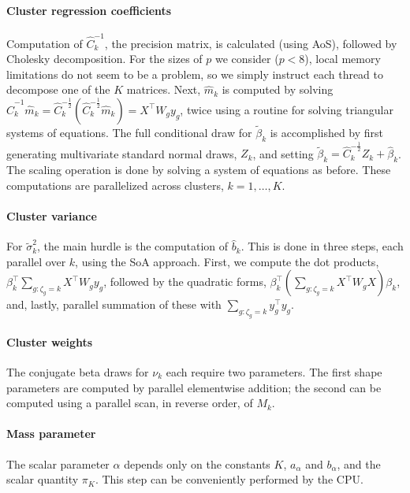 {\paragraph{Cluster regression coefficients}
Computation of
$\hat{C}_k^{-1}$, the precision matrix, is calculated (using AoS), followed
by Cholesky decomposition. For the sizes of $p$ we consider ($p<8$), local memory limitations do not seem to be a problem, so we simply instruct each thread to decompose one of the $K$ matrices. Next, $\hat{m}_k$ is computed
by solving
$\hat{C}_k^{-1}\hat{m}_k=\hat{C}_k^{-\frac{1}{2}}\left(\hat{C}_k^{-\frac{1}{2}}\hat{m}_k\right)
= X^\top W_g y_g$, twice using a routine for solving triangular
systems of equations. The full conditional draw for $\tilde{\beta}_k$ is
accomplished by first generating multivariate standard normal draws, $Z_k$, and setting $\tilde{\beta}_k =
\hat{C}_k^{-\frac{1}{2}} Z_k + \hat{\beta}_k$. The scaling operation is
done by solving a system of equations as before. These
computations are parallelized across clusters, $k=1,\ldots,K$.

\paragraph{Cluster variance}
For $\tilde{\sigma}^2_k$, the main hurdle is the computation of
$\hat{b}_k$. This is done in three steps, each parallel over $k$, using
the SoA approach. First,
we compute the dot products, $\beta_k^\top \sum_{g:\zeta_g=k}X^\top W_g y_g$, followed by the quadratic forms, $\beta_k^\top\left( \sum_{g:\zeta_g=k}
  X^\top W_g X \right) \beta_k$, and, lastly, parallel summation of
these with $\sum_{g:\zeta_g=k}y_g^\top y_g.$

\paragraph{Cluster weights}

The conjugate beta draws for $\nu_k$ each require two parameters. The
first shape parameters are computed by parallel elementwise addition;
the second can be computed using a parallel scan, in reverse order, of $M_k$.

\paragraph{Mass parameter}

The scalar parameter $\alpha$ depends only on the constants $K$, $a_\alpha$ and $b_\alpha$, and the scalar quantity $\pi_K$. This step can be conveniently performed by the CPU.



}
